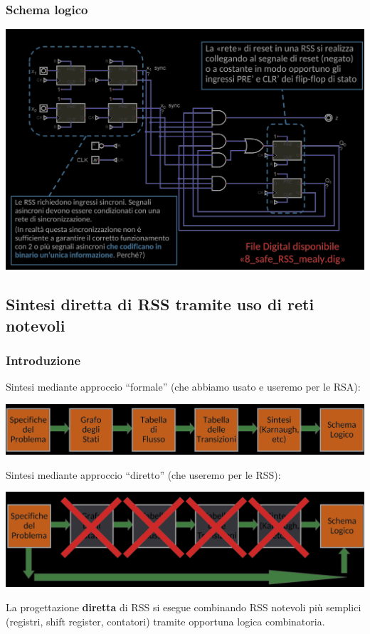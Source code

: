 \documentclass{article}
\begin{document}
\subsubsection*{Schema logico}
\begin{center}
    \includegraphics[scale=0.4]{schema logico cassaforte RSS.png}
\end{center}
\subsection{Sintesi diretta di RSS tramite uso di reti notevoli}
\subsubsection{Introduzione}
Sintesi mediante approccio “formale” (che abbiamo usato e useremo per le RSA):
\begin{center}
    \includegraphics[scale=0.35]{sintesi formale rss.png}
\end{center}
Sintesi mediante approccio “diretto” (che useremo per le RSS):
\begin{center}
    \includegraphics[scale=0.35]{sintesi diretta rss.png}
\end{center}
La progettazione \textbf{diretta} di RSS si esegue combinando RSS notevoli più semplici (registri, shift register, contatori) tramite opportuna logica combinatoria.
\end{document}
